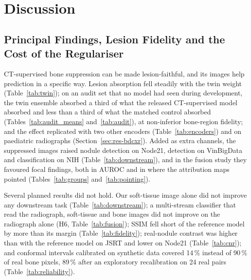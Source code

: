 \FloatBarrier
\section{Discussion}
\label{sec:discussion}

\subsection{Principal Findings, Lesion Fidelity and the Cost of the Regulariser}
\label{sec:d-principal}
CT-supervised bone suppression can be made lesion-faithful, and its images help prediction in a specific way. Lesion absorption fell
steadily with the twin weight (Table~\ref{tab:twin}); on an audit set that no model had seen during development, the twin ensemble absorbed
a third of what the released CT-supervised model absorbed and less than a third of what the matched control absorbed
(Tables~\ref{tab:audit_means} and~\ref{tab:audit}), at non-inferior bone-region fidelity; and the effect replicated with two other encoders
(Table~\ref{tab:encoders}) and on paediatric radiographs (Section~\ref{sec:res-bdcxr}). Added as extra channels, the suppressed images
raised nodule detection on Node21, detection on VinBigData and classification on NIH (Table~\ref{tab:downstream}), and in the fusion study
they favoured focal findings, both in AUROC and in where the attribution maps pointed (Tables~\ref{tab:groups} and~\ref{tab:pointing}).

Several planned results did not hold. Our soft-tissue image alone did not improve any downstream task (Table~\ref{tab:downstream}); a
multi-stream classifier that read the radiograph, soft-tissue and bone images did not improve on the radiograph alone (H6,
Table~\ref{tab:fusion}); SSIM fell short of the reference model by more than its margin (Table~\ref{tab:fidelity}); real-nodule contrast was
higher than with the reference model on JSRT and lower on Node21 (Table~\ref{tab:cnr}); and conformal intervals calibrated on synthetic
data covered 14\,\% instead of 90\,\% of real bone pixels, 89\,\% after an exploratory recalibration on 24 real pairs
(Table~\ref{tab:reliability}).

